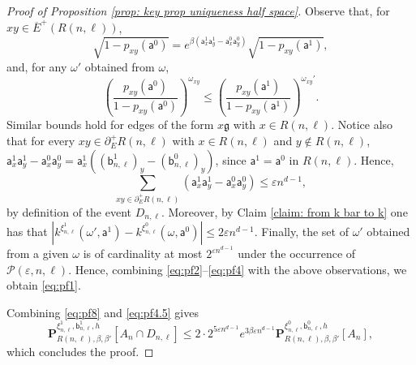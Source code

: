 \documentclass[11pt,a4paper]{article}
\numberwithin{equation}{section}
\theoremstyle{plain}
\theoremstyle{definition}
\newcommand\fg{\mathfrak{g}}
\begin{document}
\begin{proof}[Proof of Proposition \textup{\ref{prop: key prop uniqueness half space}}]
Observe that, for $xy\in \overline{E}^+(R(n,\ell))$,
\begin{equation} \label{eq:pf2}
\sqrt{1-p_{xy}(\mathsf a^0)}= e^{\beta(\mathsf{a}^1_x \mathsf{a}^1_y- \mathsf{a}^0_x \mathsf{a}^0_y)} \sqrt{1-p_{xy}(\mathsf{a}^1)},
\end{equation}
and, for any $\omega'$ obtained from $\omega$, 
\begin{equation}\label{eq:pf3}
\left(\frac{p_{xy}(\mathsf{a}^0)}{1-p_{xy}(\mathsf{a}^0)
}\right)^{\omega_{xy}}\leq \left(\frac{p_{xy}(\mathsf{a}^1)}{1-p_{xy}(\mathsf{a}^1)}\right)^{\omega_{xy}'}.
\end{equation}
Similar bounds hold for edges of the form $x\fg$ with $x\in R(n,\ell)$.
Notice also that for every $xy\in \partial^{+}_E R(n,\ell)$ with $x\in R(n,\ell)$ and $y\notin R(n,\ell)$, $\mathsf{a}^1_x \mathsf{a}^1_y- \mathsf{a}^0_x \mathsf{a}^0_y= \mathsf{a}^1_x((\mathsf{b}^1_{n,\ell})_y-(\mathsf{b}^0_{n,\ell})_y)$, since $\mathsf{a}^1=\mathsf{a}^0$ in $R(n,\ell)$. Hence,
\begin{equation}\label{eq:pf4}
\sum_{xy \in \partial^{+}_E R(n,\ell)}(\mathsf{a}^1_x \mathsf{a}^1_y- \mathsf{a}^0_x \mathsf{a}^0_y)\leq \varepsilon n^{d-1},
\end{equation}
by definition of the event $D_{n,\ell}$. Moreover, by Claim \ref{claim: from k bar to k} one has that $|k^{\xi^1_{n,\ell}}(\omega',\mathsf{a}^1)-k^{\xi^0_{n,\ell}}(\omega,\mathsf{a}^0)|\leq 2\varepsilon n^{d-1}$. Finally, the set of $\omega'$ obtained from a given $\omega$ is of cardinality at most $2^{\varepsilon n^{d-1}}$ under the occurrence of $\mathcal{P}(\varepsilon,n,\ell)$.
Hence, combining \eqref{eq:pf2}--\eqref{eq:pf4} with the above observations, we obtain \eqref{eq:pf1}. 




Combining \eqref{eq:pf8} and \eqref{eq:pf4.5} gives
\begin{equation}
\mathbf P^{\xi^1_{n,\ell},\mathsf b^1_{n,\ell}, h}_{R(n,\ell), \beta,\beta'}[A_n\cap D_{n,\ell}]\leq 2\cdot  2^{5\varepsilon n^{d-1}}e^{3\beta\varepsilon n^{d-1}}\mathbf P^{\xi^0_{n,\ell},\mathsf b^0_{n,\ell}, h}_{R(n,\ell), \beta,\beta'}[A_n],
\end{equation}
which concludes the proof.
\end{proof}
\end{document}
